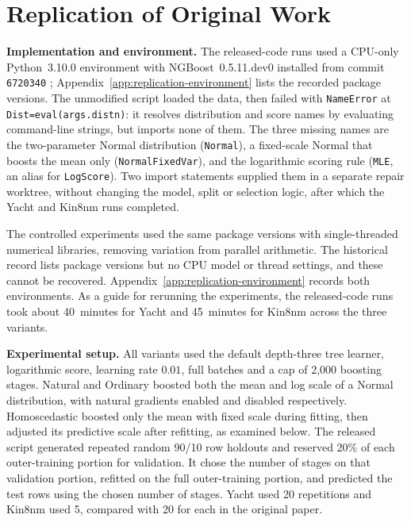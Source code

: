 \section{Replication of Original Work}
\label{sec:replication}

\textbf{Implementation and environment.}
The released-code runs used a CPU-only Python~3.10.0 environment with NGBoost~0.5.11.dev0 installed from commit \texttt{6720340} \cite{ngboostrepo}; Appendix~\ref{app:replication-environment} lists the recorded package versions.
The unmodified script loaded the data, then failed with \texttt{NameError} at \texttt{Dist=eval(args.distn)}: it resolves distribution and score names by evaluating command-line strings, but imports none of them.
The three missing names are the two-parameter Normal distribution (\texttt{Normal}), a fixed-scale Normal that boosts the mean only (\texttt{NormalFixedVar}), and the logarithmic scoring rule (\texttt{MLE}, an alias for \texttt{LogScore}).
Two import statements supplied them in a separate repair worktree, without changing the model, split or selection logic, after which the Yacht and Kin8nm runs completed.

The controlled experiments used the same package versions with single-threaded numerical libraries, removing variation from parallel arithmetic.
The historical record lists package versions but no CPU model or thread settings, and these cannot be recovered.
Appendix~\ref{app:replication-environment} records both environments.
As a guide for rerunning the experiments, the released-code runs took about 40~minutes for Yacht and 45~minutes for Kin8nm across the three variants.

\textbf{Experimental setup.}
All variants used the default depth-three tree learner, logarithmic score, learning rate $0.01$, full batches and a cap of 2{,}000 boosting stages.
Natural and Ordinary boosted both the mean and log scale of a Normal distribution, with natural gradients enabled and disabled respectively.
Homoscedastic boosted only the mean with fixed scale during fitting, then adjusted its predictive scale after refitting, as examined below.
The released script generated repeated random 90/10 row holdouts and reserved 20\% of each outer-training portion for validation.
It chose the number of stages on that validation portion, refitted on the full outer-training portion, and predicted the test rows using the chosen number of stages.
Yacht used 20 repetitions and Kin8nm used 5, compared with 20 for each in the original paper.

